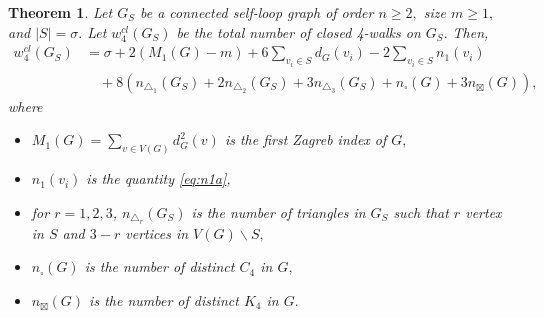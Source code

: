 \documentclass[12pt,a4paper,reqno]{amsart}
\numberwithin{equation}{section}
\theoremstyle{plain}
\newtheorem{theorem}{Theorem}[section]
\theoremstyle{definition}
\newcommand{\<}{\langle}
\renewcommand{\>}{\rangle}
\begin{document}
\begin{theorem}
\label{closed4GS}
Let $G_S$ be a connected self-loop graph of order $n\geq 2,$ size $m \geq 1,$ and $|S|=\sigma.$ Let $w^{cl}_4(G_S)$ be the total number of closed 4-walks on $G_S.$ Then,
\begin{align}
w_4^{cl}(G_S) 
&=\sigma + 2(M_1(G) - m)
+ 6 \sum_{v_i \in S} d_G(v_i) - 2 \sum_{v_i \in S} n_1(v_i)  \nonumber \\
&\quad+ 8 (n_{\triangle_1}(G_S) + 2 n_{\triangle_2}(G_S) + 3 n_{\triangle_3}(G_S) + n_\square(G) + 3n_\boxtimes(G)), \label{eq:closed4GS}
\end{align}
where 
\begin{itemize}
\item $M_1(G)=\sum_{v \in V(G)} d_G^2(v)$ is the first Zagreb index of $G,$
\item $n_1(v_i)$ is the quantity \eqref{eq:n1a}, 
\item for $r=1,2,3$, $n_{\triangle_r}(G_S)$  is the number of triangles in $G_S$ such that $r$ vertex in $S$ and $3-r$ vertices in $V(G)\backslash S,$  
\item $n_\square(G)$ is the number of distinct $C_4$ in $G,$
\item $n_\boxtimes(G)$ is the number of distinct $K_4$ in $G.$
\end{itemize}
\end{theorem}
\end{document}
